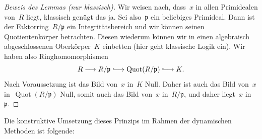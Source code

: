 \documentclass[a4paper,ngerman,12pt]{scrartcl}
\theoremstyle{definition}
\theoremstyle{plain}
\theoremstyle{remark}
\newcommand{\lhra}{\ensuremath{\lhook\joinrel\relbar\joinrel\rightarrow}}
\newcommand{\pp}{\mathfrak{p}}
\DeclareMathOperator{\Quot}{Quot}
\renewcommand{\_}{\mathpunct{.}\,}
\newcommand{\?}{\,{:}\,}
\begin{document}
\begin{proof}[Beweis des Lemmas (nur klassisch)]
Wir weisen nach, dass~$x$ in allen Primidealen von~$R$ liegt, klassisch genügt
das ja. Sei also~$\pp$ ein beliebiges Primideal. Dann ist der
Faktorring~$R/\pp$ ein Integritätsbereich und wir können seinen
Quotientenkörper betrachten. Diesen wiederum können wir in einen algebraisch
abgeschlossenen Oberkörper~$K$ einbetten (hier geht klassische Logik ein). Wir
haben also Ringhomomorphismen
\[ R \longrightarrow R/\pp \lhra \Quot(R/\pp) \lhra K. \]
Nach Voraussetzung ist das Bild von~$x$ in~$K$ Null. Daher ist auch das Bild
von~$x$ in~$\Quot(R/\pp)$ Null, somit auch das Bild von~$x$ in~$R/\pp$, und
daher liegt~$x$ in~$\pp$.
\end{proof}

Die konstruktive Umsetzung dieses Prinzips im Rahmen der dynamischen Methoden
ist folgende:
\end{document}
